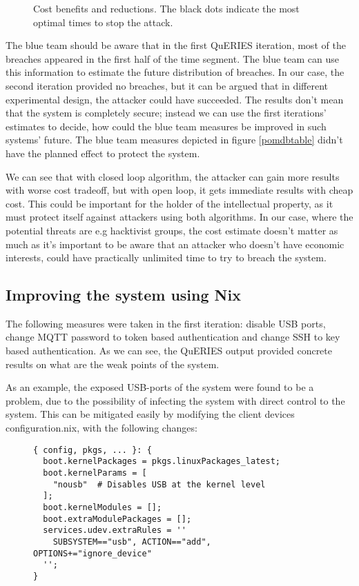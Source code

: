 \begin{figure}[t!]
\centerline{}
\caption{Cost benefits and reductions. The black dots indicate the
  most optimal times to stop the attack.}
\label{openandclosed}
\end{figure}

The blue team should be aware that in the first QuERIES iteration,
most of the breaches appeared in the first half of the time
segment. The blue team can use this information to estimate the future
distribution of breaches. In our case, the second iteration provided
no breaches, but it can be argued that in different experimental
design, the attacker could have succeeded. The results don't mean
that the system is completely secure; instead we can use the first
iterations' estimates to decide, how could the blue team measures be
improved in such systems' future. The blue team measures depicted in
figure \ref{pomdbtable} didn't have the planned effect to protect the
system. 

We can see that with closed loop algorithm, the attacker can gain more
results with worse cost tradeoff, but with open loop, it gets
immediate results with cheap cost. This could be important for the
holder of the intellectual property, as it must protect itself against
attackers using both algorithms. In our case, where the potential
threats are e.g hacktivist groups, the cost estimate doesn't matter as
much as it's important to be aware that an attacker who 
doesn't have economic interests, could have practically unlimited time
to try to breach the system.

\subsection{Improving the system using Nix}

The following measures were taken in the first iteration: disable USB
ports, change MQTT password to token based authentication and change
SSH to key based authentication. As we can see, the QuERIES output
provided concrete results on what are the weak points of the system.

As an example, the exposed USB-ports of the system were found to be a
problem, due to the possibility of infecting the system with direct
control to the system. This can be mitigated easily by modifying the
client devices configuration.nix, with the following changes:

\begin{figure}[H]
\begin{lstlisting} 
{ config, pkgs, ... }: {
  boot.kernelPackages = pkgs.linuxPackages_latest;
  boot.kernelParams = [
    "nousb"  # Disables USB at the kernel level
  ];
  boot.kernelModules = [];
  boot.extraModulePackages = [];
  services.udev.extraRules = ''
    SUBSYSTEM=="usb", ACTION=="add", OPTIONS+="ignore_device"
  '';
}
\end{lstlisting}
\label{kernelsnippet}
\end{figure}

